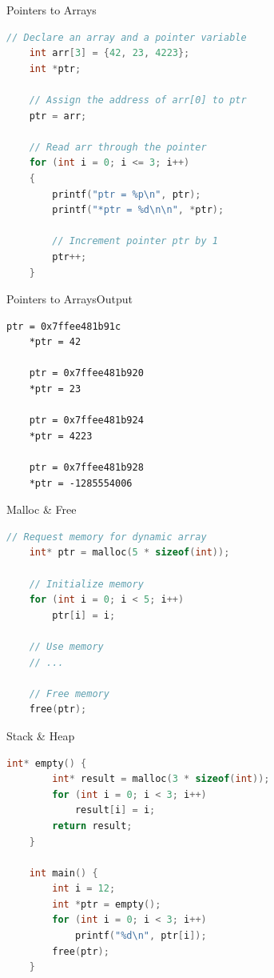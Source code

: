 \begin{Frame}[fragile]{Pointers to Arrays}
  \begin{lstlisting}[language=C,gobble=4]
    // Declare an array and a pointer variable
    int arr[3] = {42, 23, 4223};
    int *ptr;
  
    // Assign the address of arr[0] to ptr
    ptr = arr;

    // Read arr through the pointer
    for (int i = 0; i <= 3; i++) 
    { 
        printf("ptr = %p\n", ptr);
        printf("*ptr = %d\n\n", *ptr);
  
        // Increment pointer ptr by 1 
        ptr++; 
    }
  \end{lstlisting}
\end{Frame}

\begin{Frame}[fragile]{Pointers to Arrays}{Output}
  \begin{lstlisting}[gobble=4]
    ptr = 0x7ffee481b91c
    *ptr = 42
    
    ptr = 0x7ffee481b920
    *ptr = 23
    
    ptr = 0x7ffee481b924
    *ptr = 4223
    
    ptr = 0x7ffee481b928
    *ptr = -1285554006
  \end{lstlisting}
\end{Frame}

\begin{Frame}[fragile]{Malloc \& Free}
  \begin{lstlisting}[language=C,gobble=4]
    // Request memory for dynamic array
    int* ptr = malloc(5 * sizeof(int));

    // Initialize memory
    for (int i = 0; i < 5; i++)
        ptr[i] = i;

    // Use memory
    // ...

    // Free memory
    free(ptr);
  \end{lstlisting}
\end{Frame}

\begin{Frame}[fragile]{Stack \& Heap}
  \begin{lstlisting}[language=C,gobble=4]
    int* empty() {
        int* result = malloc(3 * sizeof(int));
        for (int i = 0; i < 3; i++)
            result[i] = i;
        return result;
    }

    int main() {
        int i = 12;
        int *ptr = empty();
        for (int i = 0; i < 3; i++)
            printf("%d\n", ptr[i]);
        free(ptr);
    }
  \end{lstlisting}
\end{Frame}

